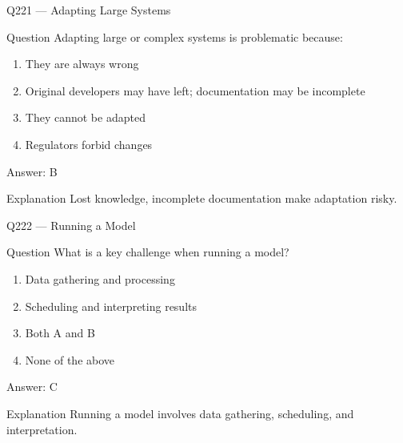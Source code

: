 \documentclass[aspectratio=169,8pt]{beamer}
\begin{document}
								\begin{frame}{Q221 --- Adapting Large Systems}
									\begin{block}{Question}
										Adapting large or complex systems is problematic because:
										\begin{enumerate}
											\item They are always wrong
											\item Original developers may have left; documentation may be incomplete
											\item They cannot be adapted
											\item Regulators forbid changes
										\end{enumerate}
									\end{block}
									\begin{exampleblock}{Answer: B}\end{exampleblock}
									\begin{block}{Explanation}
										Lost knowledge, incomplete documentation make adaptation risky.
									\end{block}
								\end{frame}
								
								\begin{frame}{Q222 --- Running a Model}
									\begin{block}{Question}
										What is a key challenge when running a model?
										\begin{enumerate}
											\item Data gathering and processing
											\item Scheduling and interpreting results
											\item Both A and B
											\item None of the above
										\end{enumerate}
									\end{block}
									\begin{exampleblock}{Answer: C}\end{exampleblock}
									\begin{block}{Explanation}
										Running a model involves data gathering, scheduling, and interpretation.
									\end{block}
								\end{frame}
								
\end{document}

